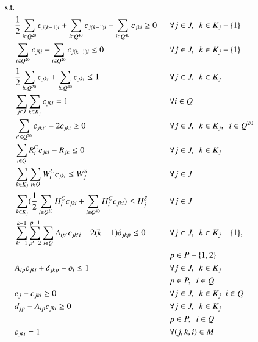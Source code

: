 \documentclass[preprint,11pt,3p]{elsarticle}
\begin{document}
\begin{alignat}{15}    
    \text{s.t.} & & \nonumber \\
                & \frac{1}{2} \sum_{i \in Q^{20}} c_{j(k-1)i} + \sum_{i \in Q^{40}} c_{j(k-1)i} - \sum_{i \in Q^{40}} c_{jki} \geq 0 \enskip && \forall j \in J, \enskip k \in K_j - \{1\} \label{eq:constr1}\\
                & \sum_{i \in Q^{20}} c_{jki} - \sum_{i \in Q^{20}} c_{j(k-1)i} \leq  0 && \forall j \in J, \enskip k \in K_j - \{1\} \label{eq:constr2}\\
                & \frac{1}{2} \sum_{i \in Q^{20}} c_{jki} + \sum_{i \in Q^{40}} c_{jki} \leq  1 && \forall j \in J, \enskip k \in K_j \label{eq:constr3}\\
                & \sum_{j \in J} \sum_{k \in K_j} c_{jki} = 1 && \forall i \in Q \label{eq:constr4}\\
                & \sum_{i' \in Q^{20}} c_{jki'} - 2c_{jki} \geq  0 && \forall j \in J, \enskip  k \in K_j, \enskip i \in Q^{20} \label{eq:constr5}\\
                & \sum_{i \in Q} R^{C}_{i}c_{jki} - R_{jk} \leq  0 && \forall j \in J, \enskip k \in K_j \label{eq:constr6}\\
                & \sum_{k \in K_j} \sum_{i \in Q}  W^{C}_{i}c_{jki} \leq W^{S}_{j} && \forall j \in J \label{eq:constr7}\\
                & \sum_{k \in K_j} (\frac{1}{2} \sum_{i \in Q^{20}} H^{C}_{i}c_{jki} + \sum_{i \in Q^{40}} H^{C}_{i}c_{jki}) \leq H^{S}_{j} && \forall j \in J \label{eq:constr8}\\
                & \sum_{k'=1}^{k-1} \sum_{p'=2}^{p-1} \sum_{i \in Q} A_{ip'}c_{jk'i} - 2(k - 1)\delta_{jkp} \leq 0 && \forall j \in J, \enskip  k \in K_j - \{1\},  \label{eq:constr9}\\
                & && p \in P - \{1, 2\} \nonumber\\
                & A_{ip}c_{jki} +  \delta_{jkp} - o_i \leq  1 && \forall j \in J, \enskip k \in K_j \label{eq:constr10}\\
                & && p \in P, \enskip i \in Q \nonumber\\
                & e_j - c_{jki} \geq  0 && \forall j \in J, \enskip k \in K_j \enskip i \in Q \label{eq:constr11}\\
                & d_{jp} - A_{ip}c_{jki}  \geq  0 && \forall j \in J, \enskip k \in K_j \label{eq:constr12}\\ 
                & && p \in P, \enskip i \in Q \nonumber\\
                & c_{jki} = 1 && \forall (j,k,i) \in M \label{eq:constr13}
\end{alignat}
\normalsize
\end{document}
